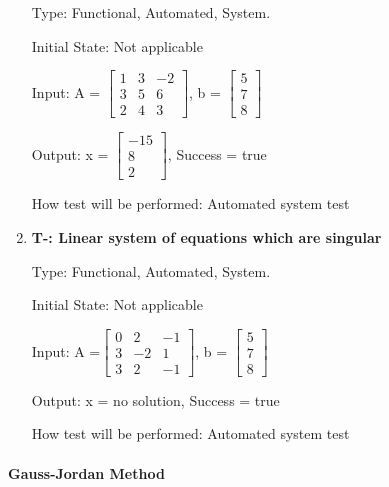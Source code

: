 \documentclass[12pt, titlepage]{article}
\newcounter{tnum}
\begin{document}
\begin{enumerate}
Type: Functional, Automated, System.
					
Initial State: Not applicable
					
Input: A =  $\begin{bmatrix} 
1 & 3 & -2 \\
3 & 5 & 6\\
2 & 4 & 3
\end{bmatrix}$, b = $\begin{bmatrix} 
5\\
7\\
8 
\end{bmatrix}$

				
Output: x = $\begin{bmatrix} 
-15\\
8\\
2 
\end{bmatrix}$, Success = true
					
How test will be performed: Automated system test

\item{\textbf{T-\thetnum \label{t-gaussian
elimination_three}: Linear system of equations which are singular}}

Type: Functional, Automated, System.
					
Initial State: Not applicable
					
Input: A =$\begin{bmatrix} 
0 & 2 & -1 \\
3 & -2 & 1\\
3 & 2 & -1
\end{bmatrix}$, b = $\begin{bmatrix} 
5\\
7\\
8 
\end{bmatrix}$
					
Output: x = no solution, Success = true
					
How test will be performed: Automated system test

\end{enumerate}



\paragraph{Gauss-Jordan Method }

\end{document}
